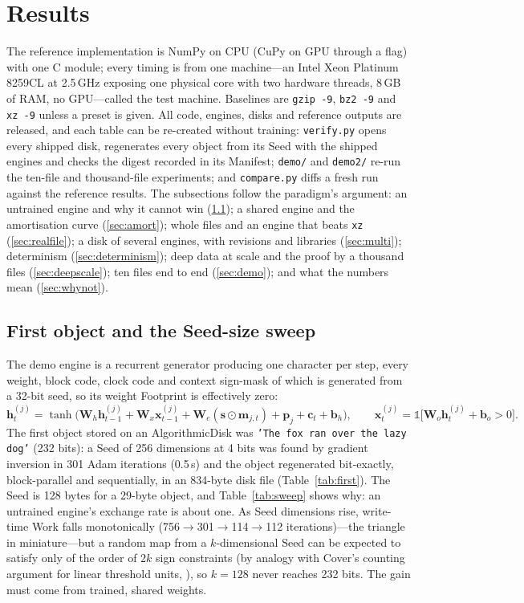 \documentclass[11pt,a4paper]{article}
\theoremstyle{definition}
\theoremstyle{plain}
\theoremstyle{remark}
\newcommand{\adisk}{AlgorithmicDisk}
\newcommand{\seed}{\mathbf{s}}
\begin{document}
\section{Results}
\label{sec:results}
The reference implementation is NumPy on CPU (CuPy on GPU through a flag) with one C module;
every timing is from one machine---an Intel Xeon Platinum 8259CL at 2.5\,GHz exposing one
physical core with two hardware threads, 8\,GB of RAM, no GPU---called the test machine.
Baselines are \texttt{gzip -9}, \texttt{bz2 -9} and \texttt{xz -9} unless a preset is given.
All code, engines, disks and reference outputs are released, and each table can be re-created
without training: \texttt{verify.py} opens every shipped disk, regenerates every object from its
Seed with the shipped engines and checks the digest recorded in its Manifest; \texttt{demo/} and
\texttt{demo2/} re-run the ten-file and thousand-file experiments; and \texttt{compare.py} diffs a
fresh run against the reference results. The subsections follow the
paradigm's argument: an untrained engine and why it cannot win (\ref{sec:sweep}); a shared
engine and the amortisation curve (\ref{sec:amort}); whole files and an engine that beats
\texttt{xz} (\ref{sec:realfile}); a disk of several engines, with revisions and libraries
(\ref{sec:multi}); determinism (\ref{sec:determinism}); deep data at scale and the proof by a
thousand files (\ref{sec:deepscale}); ten files end to end (\ref{sec:demo}); and what the numbers
mean (\ref{sec:whynot}).

\subsection{First object and the Seed-size sweep}
\label{sec:sweep}
The demo engine is a recurrent generator producing one character per step, every weight, block
code, clock code and context sign-mask of which is generated from a 32-bit seed, so its weight
Footprint is effectively zero:
\begin{equation}
  \mathbf{h}^{(j)}_{t}=\tanh\!\big(\mathbf{W}_h\mathbf{h}^{(j)}_{t-1}+\mathbf{W}_x\mathbf{x}^{(j)}_{t-1}
  +\mathbf{W}_e(\seed\odot\mathbf{m}_{j,t})+\mathbf{p}_j+\mathbf{c}_t+\mathbf{b}_h\big),\qquad
  \mathbf{x}^{(j)}_{t}=\mathbb{1}\big[\mathbf{W}_o\mathbf{h}^{(j)}_{t}+\mathbf{b}_o>0\big].
\end{equation}
The first
object stored on an \adisk{} was \texttt{'The fox ran over the lazy dog'} (232 bits): a Seed of
256 dimensions at 4 bits was found by gradient inversion in 301 Adam iterations (0.5\,s) and the
object regenerated bit-exactly, block-parallel and sequentially, in an 834-byte disk file
(Table~\ref{tab:first}). The Seed is 128 bytes for a 29-byte object, and Table~\ref{tab:sweep} shows why: an untrained engine's
exchange rate is about one. As Seed dimensions rise, write-time Work falls monotonically
(756$\to$301$\to$114$\to$112 iterations)---the triangle in miniature---but a random map from a
$k$-dimensional Seed can be expected to satisfy only of the order of $2k$ sign constraints (by
analogy with Cover's counting argument for linear threshold units, \citealp{cover1965}), so
$k=128$ never reaches 232 bits. The gain must come from trained, shared
weights.
\end{document}
